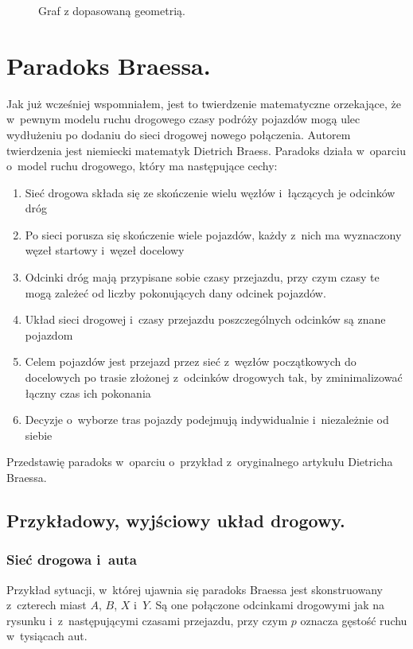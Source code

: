 \documentclass[twoside,12pt]{report}
\begin{document}
\begin{figure}[h]
\begin{flushright}
\begin{minipage}[]{.45\textwidth}
	\caption{Graf z dopasowaną geometrią.}
	\end{minipage}
\end{flushright}
\end{figure}

\section{Paradoks Braessa.}

Jak już wcześniej wspomniałem, jest to twierdzenie matematyczne orzekające, że w~pewnym modelu ruchu drogowego czasy podróży pojazdów mogą ulec wydłużeniu po dodaniu do sieci drogowej nowego połączenia. Autorem twierdzenia jest niemiecki matematyk Dietrich Braess\cite{braess}. Paradoks działa w~oparciu o~model ruchu drogowego, który ma następujące cechy:

\begin{enumerate}
\item Sieć drogowa składa się ze skończenie wielu węzłów i~łączących je odcinków dróg
\item Po sieci porusza się skończenie wiele pojazdów, każdy z~nich ma wyznaczony węzeł startowy i~węzeł docelowy
\item Odcinki dróg mają przypisane sobie czasy przejazdu, przy czym czasy te mogą zależeć od liczby pokonujących dany odcinek pojazdów.
\item Układ sieci drogowej i~czasy przejazdu poszczególnych odcinków są znane pojazdom
\item Celem pojazdów jest przejazd przez sieć z~węzłów początkowych do docelowych po trasie złożonej z~odcinków drogowych tak, by zminimalizować łączny czas ich pokonania
\item Decyzje o~wyborze tras pojazdy podejmują indywidualnie i~niezależnie od siebie
\end{enumerate}
Przedstawię paradoks w~oparciu o~przykład z~oryginalnego artykułu Dietricha Braessa\cite{paradox}.

\subsection{Przykładowy, wyjściowy układ drogowy.}
\subsubsection{Sieć drogowa i~auta}

Przykład sytuacji, w~której ujawnia się paradoks Braessa jest skonstruowany z~czterech miast $A$, $B$, $X$ i~$Y$. Są one połączone odcinkami drogowymi jak na rysunku i~z~następującymi czasami przejazdu, przy czym $p$ oznacza gęstość ruchu w~tysiącach aut.
\end{document}
